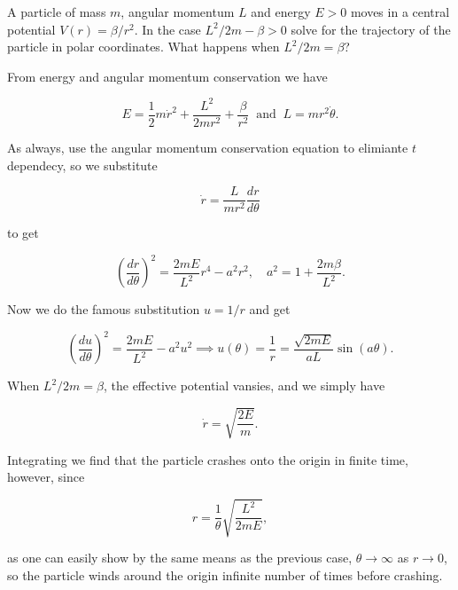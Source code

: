 \documentclass[a4paper,12pt]{report}
\begin{document}


{A particle of mass \(m\), angular momentum \(L\) and energy \(E > 0\) moves in a central potential \(V(r) = \beta /r^2\). In the case \(L^2/2m - \beta > 0\) solve for the trajectory of the particle in polar coordinates. What happens when \(L^2/2m = \beta \)? }
{From energy and angular momentum conservation we have 

\begin{equation}
	E = \frac{1}{2}m \dot{r} ^2 + \frac{L^2}{2mr^2} + \frac{\beta }{r^2} ~\text { and }~ L = mr^2 \dot{\theta }. 
\end{equation}

As always, use the angular momentum conservation equation to elimiante \(t\) dependecy, so we substitute

\begin{equation}
	\dot{r} = \frac{L}{mr^2} \frac{dr}{d \theta }  
\end{equation}

to get

\begin{equation}
	\left( \frac{dr}{d \theta }  \right)^2 = \frac{2mE}{L^2} r^4 - a^2 r^2, \quad a^2 = 1+ \frac{2m\beta }{L^2}. 
\end{equation}

Now we do the famous substitution \(u = 1/r\) and get  

\begin{equation}
	\left( \frac{du}{d \theta }  \right)^2 = \frac{2mE}{L^2} - a^2u^2 \implies u(\theta ) = \frac{1}{r} = \frac{\sqrt{2mE} }{aL} \sin (a \theta ).  
\end{equation}

When \(L^2/2m = \beta \), the effective potential vansies, and we simply have 

\begin{equation}
	\dot{r} = \sqrt{\frac{2E}{m} }.  
\end{equation}

Integrating we find that the particle crashes onto the origin in finite time, however, since 

\begin{equation}
	r = \frac{1}{\theta } \sqrt{\frac{L^2}{2mE} },  
\end{equation}

as one can easily show by the same means as the previous case, \(\theta \to \infty\) as \(r \to 0\), so the particle winds around the origin infinite number of times before crashing.  
} 
\end{document}
